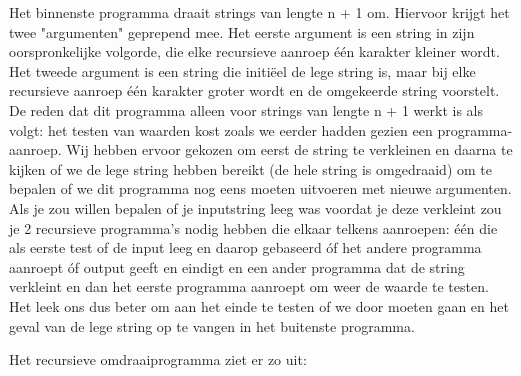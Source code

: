 Het binnenste programma draait strings van lengte n + 1 om. Hiervoor krijgt het twee "argumenten" geprepend mee. Het eerste argument is een string in zijn oorspronkelijke volgorde, die elke recursieve aanroep \'{e}\'{e}n karakter kleiner wordt. Het tweede argument is een string die initi\"{e}el de lege string is, maar bij elke recursieve aanroep \'{e}\'{e}n karakter groter wordt en de omgekeerde string voorstelt. De reden dat dit programma alleen voor strings van lengte n + 1 werkt is als volgt: het testen van waarden kost zoals we eerder hadden gezien een programma-aanroep. Wij hebben ervoor gekozen om eerst de string te verkleinen en daarna te kijken of we de lege string hebben bereikt (de hele string is omgedraaid) om te bepalen of we dit programma nog eens moeten uitvoeren met nieuwe argumenten. Als je zou willen bepalen of je inputstring leeg was voordat je deze verkleint zou je 2 recursieve programma's nodig hebben die elkaar telkens aanroepen: \'{e}\'{e}n die als eerste test of de input leeg en daarop gebaseerd \'{o}f het andere programma aanroept \'{o}f output geeft en eindigt en een ander programma dat de string verkleint en dan het eerste programma aanroept om weer de waarde te testen. Het leek ons dus beter om aan het einde te testen of we door moeten gaan en het geval van de lege string op te vangen in het buitenste programma.

Het recursieve omdraaiprogramma ziet er zo uit:

